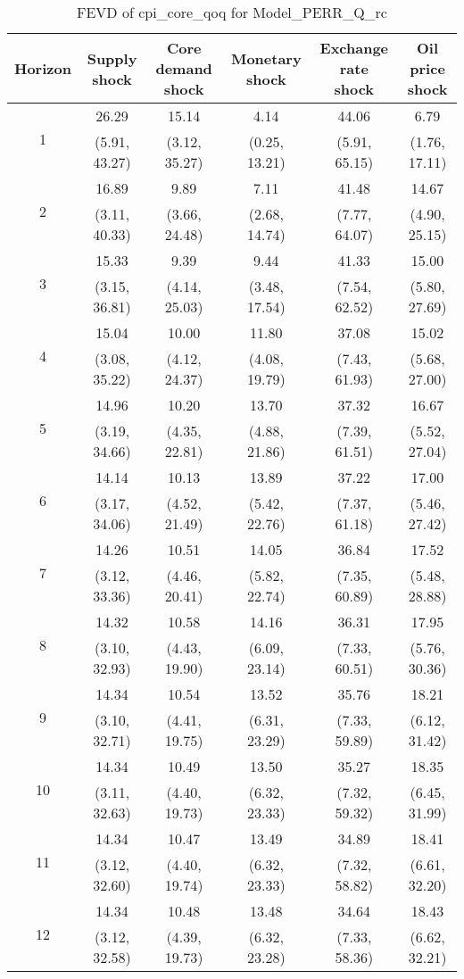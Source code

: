 \documentclass{article}
\begin{document}
\begin{table}
	\footnotesize
	\caption{FEVD of cpi_core_qoq for Model_PERR_Q_rc}
	\begin{tabular}{cccccc}
		Horizon & Supply shock & Core demand shock & Monetary shock & Exchange rate shock & Oil price shock\\ \hline
		\multirow{2}{*}{1} & 26.29 & 15.14 & 4.14 & 44.06 & 6.79\\
		 & (5.91, 43.27) & (3.12, 35.27) & (0.25, 13.21) & (5.91, 65.15) & (1.76, 17.11)\\
		\multirow{2}{*}{2} & 16.89 & 9.89 & 7.11 & 41.48 & 14.67\\
		 & (3.11, 40.33) & (3.66, 24.48) & (2.68, 14.74) & (7.77, 64.07) & (4.90, 25.15)\\
		\multirow{2}{*}{3} & 15.33 & 9.39 & 9.44 & 41.33 & 15.00\\
		 & (3.15, 36.81) & (4.14, 25.03) & (3.48, 17.54) & (7.54, 62.52) & (5.80, 27.69)\\
		\multirow{2}{*}{4} & 15.04 & 10.00 & 11.80 & 37.08 & 15.02\\
		 & (3.08, 35.22) & (4.12, 24.37) & (4.08, 19.79) & (7.43, 61.93) & (5.68, 27.00)\\
		\multirow{2}{*}{5} & 14.96 & 10.20 & 13.70 & 37.32 & 16.67\\
		 & (3.19, 34.66) & (4.35, 22.81) & (4.88, 21.86) & (7.39, 61.51) & (5.52, 27.04)\\
		\multirow{2}{*}{6} & 14.14 & 10.13 & 13.89 & 37.22 & 17.00\\
		 & (3.17, 34.06) & (4.52, 21.49) & (5.42, 22.76) & (7.37, 61.18) & (5.46, 27.42)\\
		\multirow{2}{*}{7} & 14.26 & 10.51 & 14.05 & 36.84 & 17.52\\
		 & (3.12, 33.36) & (4.46, 20.41) & (5.82, 22.74) & (7.35, 60.89) & (5.48, 28.88)\\
		\multirow{2}{*}{8} & 14.32 & 10.58 & 14.16 & 36.31 & 17.95\\
		 & (3.10, 32.93) & (4.43, 19.90) & (6.09, 23.14) & (7.33, 60.51) & (5.76, 30.36)\\
		\multirow{2}{*}{9} & 14.34 & 10.54 & 13.52 & 35.76 & 18.21\\
		 & (3.10, 32.71) & (4.41, 19.75) & (6.31, 23.29) & (7.33, 59.89) & (6.12, 31.42)\\
		\multirow{2}{*}{10} & 14.34 & 10.49 & 13.50 & 35.27 & 18.35\\
		 & (3.11, 32.63) & (4.40, 19.73) & (6.32, 23.33) & (7.32, 59.32) & (6.45, 31.99)\\
		\multirow{2}{*}{11} & 14.34 & 10.47 & 13.49 & 34.89 & 18.41\\
		 & (3.12, 32.60) & (4.40, 19.74) & (6.32, 23.33) & (7.32, 58.82) & (6.61, 32.20)\\
		\multirow{2}{*}{12} & 14.34 & 10.48 & 13.48 & 34.64 & 18.43\\
		 & (3.12, 32.58) & (4.39, 19.73) & (6.32, 23.28) & (7.33, 58.36) & (6.62, 32.21)\\
	\end{tabular}
\label{tab:fevd-Model_PERR_Q_rc-cpi_core_qoq}
\end{table}
\end{document}
